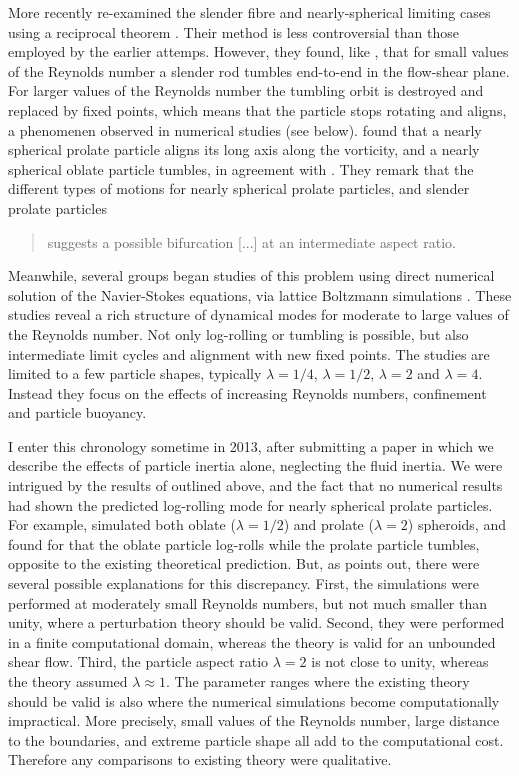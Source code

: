 \documentclass[thesis.tex]{subfiles}
\begin{document}
More recently \citet{subramanian2005,subramanian2006} re-examined the slender fibre and nearly-spherical limiting cases using a reciprocal theorem \cite{kim1991,lovalenti1993}. Their method is less controversial than those employed by the earlier attemps. However, they found, like \citet{harper1968}, that for small values of the Reynolds number a slender rod tumbles end-to-end in the flow-shear plane. For larger values of the Reynolds number the tumbling orbit is destroyed and replaced by fixed points, which means that the particle stops rotating and aligns, a phenomenen observed in numerical studies \cite{ding2000} (see below). \citet{subramanian2006} found that a nearly spherical prolate particle aligns its long axis along the vorticity, and a nearly spherical oblate particle tumbles, in agreement with \citet{saffman1956}. They remark that the different types of motions for nearly spherical prolate particles, and slender prolate particles \blockquote{suggests a possible bifurcation [...] at an intermediate aspect ratio.}

Meanwhile, several groups began studies of this problem using direct numerical solution of the Navier-Stokes equations, via lattice Boltzmann simulations \cite{feng1995,ding2000,qi2003,yu2007,huang2012,rosen2014,mao2014,rosen2015a,rosen2015b}. These studies reveal a rich structure of dynamical modes for moderate to large values of the Reynolds number. Not only log-rolling or tumbling is possible, but also intermediate limit cycles and alignment with new fixed points. The studies are limited to a few particle shapes, typically $\lambda=1/4$, $\lambda=1/2$, $\lambda=2$ and $\lambda=4$. Instead they focus on the effects of increasing Reynolds numbers, confinement and particle buoyancy.

I enter this chronology sometime in 2013, after submitting a paper \cite{einarsson2014} in which we describe the effects of particle inertia alone, neglecting the fluid inertia. We were intrigued by the results of \citet{subramanian2005,subramanian2006} outlined above, and the fact that no numerical results had shown the predicted log-rolling mode for nearly spherical prolate particles. For example, \citet{qi2003} simulated both oblate ($\lambda=1/2$) and prolate ($\lambda=2$) spheroids, and found for that the oblate particle log-rolls while the prolate particle tumbles, opposite to the existing theoretical prediction. But, as \citet{subramanian2006} points out, there were several possible explanations for this discrepancy. First, the simulations were performed at moderately small Reynolds numbers, but not much smaller than unity, where a perturbation theory should be valid. Second, they were performed in a finite computational domain, whereas the theory is valid for an unbounded shear flow. Third, the particle aspect ratio $\lambda=2$ is not close to unity, whereas the theory assumed $\lambda\approx1$. The parameter ranges where the existing theory should be valid is also where the numerical simulations become computationally impractical. More precisely, small values of the Reynolds number, large distance to the boundaries, and extreme particle shape all add to the computational cost. Therefore any comparisons to existing theory were qualitative.
\end{document}

